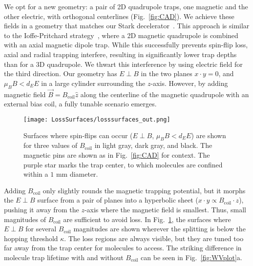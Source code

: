 \documentclass[%
 reprint,
 amsmath,amssymb,
 aps,
prl,
]{revtex4-1}
\newcommand{\bcl}{{$B_\text{coil}$}}
\newcommand{\epb}{{$E\!\perp\!B$}}
\begin{document}
We opt for a new geometry: a pair of 2D quadrupole traps, one magnetic and the other electric, with orthogonal centerlines (Fig.~\ref{fig:CAD}). We achieve these fields in a geometry that matches our Stark decelerator~\cite{Bochinski2003}. This approach is similar to the Ioffe-Pritchard strategy~\cite{pritchard1983}, where a 2D magnetic quadrupole is combined with an axial magnetic dipole trap. While this successfully prevents spin-flip loss, axial and radial trapping interfere, resulting in significantly lower trap depths than for a 3D quadrupole. We thwart this interference by using electric field for the third direction. Our geometry has \epb{} in the two planes $x\cdot y=0$, and $\mu_BB < d_EE$ in a large cylinder surrounding the $z$-axis. However, by adding magnetic field $\vec{B}=B_\text{coil}\hat{z}$ along the centerline of the magnetic quadrupole with an external bias coil, a fully tunable scenario emerges. %


\begin{figure}[tb]
\texttt{[image: LossSurfaces/losssurfaces\_out.png]}%
\caption{
Surfaces where spin-flips can occur (\epb{}, $\mu_BB<d_EE$) are shown for three values of \bcl{} in light gray, dark gray, and black. The magnetic pins are shown as in Fig.~\ref{fig:CAD} for context. The purple star marks the trap center, to which molecules are confined within a \raisebox{2.5px}{\texttildelow} $\!\!1\text{ mm}$ diameter.}
\label{fig:LSurfs}
\end{figure}

Adding \bcl{} only slightly rounds the magnetic trapping potential, but it morphs the \epb{} surface from a pair of planes into a hyperbolic sheet ($x\cdot y\propto B_\text{coil}\cdot z$), pushing it away from the $z$-axis where the magnetic field is smallest. Thus, small magnitudes of \bcl{} are sufficient to avoid loss. In Fig.~\ref{fig:LSurfs}, the surfaces where \epb{} for several \bcl{} magnitudes are shown wherever the splitting is below the hopping threshold $\kappa$. The loss regions are always visible, but they are tuned too far away from the trap center for molecules to access. The striking difference in molecule trap lifetime with and without \bcl{} can be seen in Fig.~\ref{fig:WVplot}a.
\end{document}
